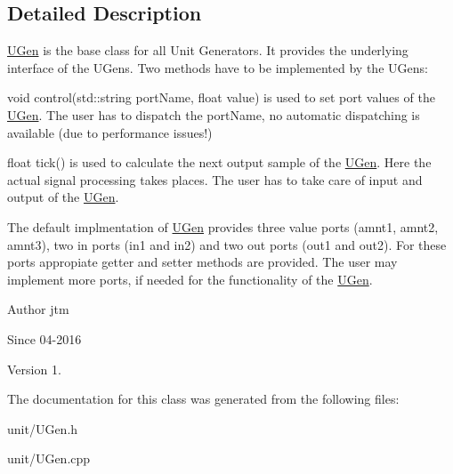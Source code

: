 \subsection{Detailed Description}
\hyperlink{classunit_1_1UGen}{U\+Gen} is the base class for all Unit Generators. It provides the underlying interface of the U\+Gens. Two methods have to be implemented by the U\+Gens\+:

void control(std\+::string port\+Name, float value) is used to set port values of the \hyperlink{classunit_1_1UGen}{U\+Gen}. The user has to dispatch the port\+Name, no automatic dispatching is available (due to performance issues!)

float tick() is used to calculate the next output sample of the \hyperlink{classunit_1_1UGen}{U\+Gen}. Here the actual signal processing takes places. The user has to take care of input and output of the \hyperlink{classunit_1_1UGen}{U\+Gen}.

The default implmentation of \hyperlink{classunit_1_1UGen}{U\+Gen} provides three value ports (amnt1, amnt2, amnt3), two in ports (in1 and in2) and two out ports (out1 and out2). For these ports appropiate getter and setter methods are provided. The user may implement more ports, if needed for the functionality of the \hyperlink{classunit_1_1UGen}{U\+Gen}.

\begin{DoxyAuthor}{Author}
jtm 
\end{DoxyAuthor}
\begin{DoxySince}{Since}
04-\/2016 
\end{DoxySince}
\begin{DoxyVersion}{Version}
1. 
\end{DoxyVersion}


The documentation for this class was generated from the following files\+:\begin{DoxyCompactItemize}
\item 
unit/U\+Gen.\+h\item 
unit/U\+Gen.\+cpp\end{DoxyCompactItemize}
